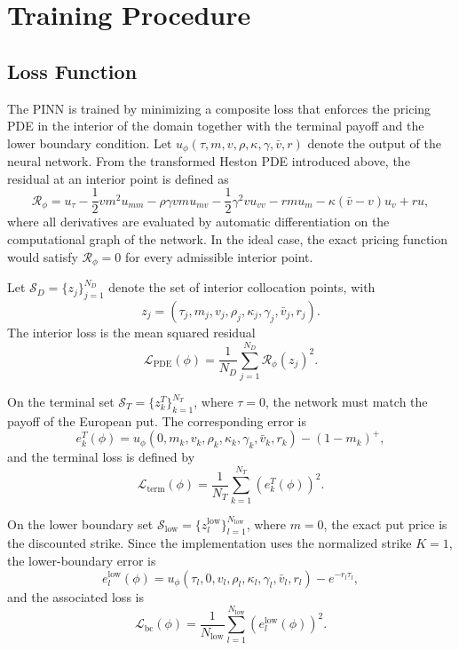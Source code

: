 \section{Training Procedure}

\subsection{Loss Function}

The PINN is trained by minimizing a composite loss that enforces the pricing PDE in the interior of the domain together with the terminal payoff and the lower boundary condition. Let $u_\phi(\tau,m,v,\rho,\kappa,\gamma,\bar v,r)$ denote the output of the neural network. From the transformed Heston PDE introduced above, the residual at an interior point is defined as
\begin{equation}
\mathcal{R}_\phi =
u_{\tau}
-\frac{1}{2}vm^2u_{mm}
-\rho\gamma vm u_{mv}
-\frac{1}{2}\gamma^2 v u_{vv}
-rm u_m
-\kappa(\bar v-v)u_v
+ru,
\end{equation}
where all derivatives are evaluated by automatic differentiation on the computational graph of the network. In the ideal case, the exact pricing function would satisfy $\mathcal{R}_\phi=0$ for every admissible interior point.

Let $\mathcal{S}_D=\{z_j\}_{j=1}^{N_D}$ denote the set of interior collocation points, with
\[
z_j=(\tau_j,m_j,v_j,\rho_j,\kappa_j,\gamma_j,\bar v_j,r_j).
\]
The interior loss is the mean squared residual
\begin{equation}
\mathcal{L}_{\mathrm{PDE}}(\phi)=
\frac{1}{N_D}\sum_{j=1}^{N_D}\mathcal{R}_\phi(z_j)^2.
\end{equation}

On the terminal set $\mathcal{S}_T=\{z_k^T\}_{k=1}^{N_T}$, where $\tau=0$, the network must match the payoff of the European put. The corresponding error is
\begin{equation}
e_k^{T}(\phi)=u_\phi(0,m_k,v_k,\rho_k,\kappa_k,\gamma_k,\bar v_k,r_k)-(1-m_k)^+,
\end{equation}
and the terminal loss is defined by
\begin{equation}
\mathcal{L}_{\mathrm{term}}(\phi)=
\frac{1}{N_T}\sum_{k=1}^{N_T}\left(e_k^{T}(\phi)\right)^2.
\end{equation}

On the lower boundary set $\mathcal{S}_{\mathrm{low}}=\{z_l^{\mathrm{low}}\}_{l=1}^{N_{\mathrm{low}}}$, where $m=0$, the exact put price is the discounted strike. Since the implementation uses the normalized strike $K=1$, the lower-boundary error is
\begin{equation}
e_l^{\mathrm{low}}(\phi)=
u_\phi(\tau_l,0,v_l,\rho_l,\kappa_l,\gamma_l,\bar v_l,r_l)-e^{-r_l\tau_l},
\end{equation}
and the associated loss is
\begin{equation}
\mathcal{L}_{\mathrm{bc}}(\phi)=
\frac{1}{N_{\mathrm{low}}}\sum_{l=1}^{N_{\mathrm{low}}}\left(e_l^{\mathrm{low}}(\phi)\right)^2.
\end{equation}

